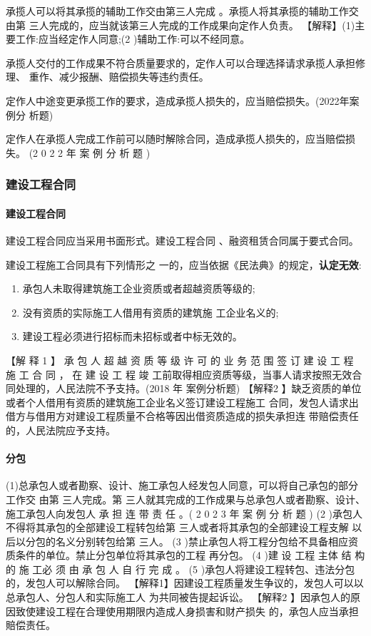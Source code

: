 \documentclass[UTF8,12pt]{ctexart}
\numberwithin{equation}{section} %
\numberwithin{figure}{section}
\numberwithin{table}{section}
\begin{document}
	承揽人可以将其承揽的辅助工作交由第三人完成 。承揽人将其承揽的辅助工作交由第 三人完成的，应当就该第三人完成的工作成果向定作人负责。
	【解释】(1)主要工作:应当经定作人同意;(2 )辅助工作:可以不经同意。
	
	承揽人交付的工作成果不符合质量要求的，定作人可以合理选择请求承揽人承担修理、 重作、减少报酬、赔偿损失等违约责任。
	
	定作人中途变更承揽工作的要求，造成承揽人损失的，应当赔偿损失。(2022年案例分 析题)
	
	定作人在承揽人完成工作前可以随时解除合同，造成承揽人损失的，应当赔偿损失。 (2 0 2 2 年 案 例 分 析 题 )
	
	
	\subsubsection{建设工程合同}
	\paragraph{建设工程合同}
	建设工程合同应当采用书面形式。建设工程合同 、融资租赁合同属于要式合同。
	
	
	建设工程施工合同具有下列情形之 一的，应当依据《民法典》的规定，\textbf{认定无效}: 
	\begin{enumerate}
		\item 承包人未取得建筑施工企业资质或者超越资质等级的;
		
		\item 没有资质的实际施工人借用有资质的建筑施 工企业名义的;
		
		\item 建设工程必须进行招标而未招标或者中标无效的。
	\end{enumerate}
	【解 释 1 】 承 包 人 超 越 资 质 等 级 许 可 的 业 务 范 围 签 订 建 设 工 程 施 工 合 同 ， 在 建 设 工 程 竣 工前取得相应资质等级，当事人请求按照无效合同处理的，人民法院不予支持。(2018 年 案例分析题)
	【解释2 】缺乏资质的单位或者个人借用有资质的建筑施工企业名义签订建设工程施工 合同，发包人请求出借方与借用方对建设工程质量不合格等因出借资质造成的损失承担连 带赔偿责任的，人民法院应予支持。
	
	\paragraph{分包} (1)总承包人或者勘察、设计、施工承包人经发包人同意，可以将自己承包的部分工作交 由第 三人完成。第 三人就其完成的工作成果与总承包人或者勘察、设计、施工承包人向发包人 承 担 连 带 责 任 。( 2 0 2 3 年 案 例 分 析 题 )
	(2 )承包人不得将其承包的全部建设工程转包给第 三人或者将其承包的全部建设工程支解 以后以分包的名义分别转包给第 三人。
	(3 )禁止承包人将工程分包给不具备相应资质条件的单位。禁止分包单位将其承包的工程 再分包。
	(4 )建 设 工程 主体 结 构 的 施 工必 须 由 承 包 人 自 行 完 成 。
	(5 )承包人将建设工程转包、违法分包的，发包人可以解除合同。
	【解释1】因建设工程质量发生争议的，发包人可以以总承包人、分包人和实际施工人 为共同被告提起诉讼。
	【解释2 】因承包人的原因致使建设工程在合理使用期限内造成人身损害和财产损失 的，承包人应当承担賠偿责任。
	
\end{document}

